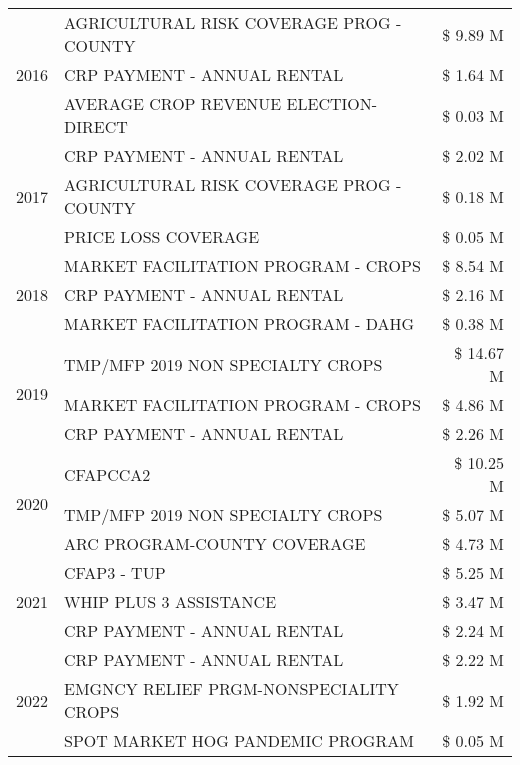 \begin{tabular}{llr}
\cline{1-3}
\multirow[t]{3}{*}{2016} & AGRICULTURAL RISK COVERAGE PROG - COUNTY & \$ 9.89 M \\
 & CRP PAYMENT - ANNUAL RENTAL & \$ 1.64 M \\
 & AVERAGE CROP REVENUE ELECTION-DIRECT & \$ 0.03 M \\
\cline{1-3}
\multirow[t]{3}{*}{2017} & CRP PAYMENT - ANNUAL RENTAL & \$ 2.02 M \\
 & AGRICULTURAL RISK COVERAGE PROG - COUNTY & \$ 0.18 M \\
 & PRICE LOSS COVERAGE & \$ 0.05 M \\
\cline{1-3}
\multirow[t]{3}{*}{2018} & MARKET FACILITATION PROGRAM - CROPS & \$ 8.54 M \\
 & CRP PAYMENT - ANNUAL RENTAL & \$ 2.16 M \\
 & MARKET FACILITATION PROGRAM - DAHG & \$ 0.38 M \\
\cline{1-3}
\multirow[t]{3}{*}{2019} & TMP/MFP 2019 NON SPECIALTY CROPS & \$ 14.67 M \\
 & MARKET FACILITATION PROGRAM - CROPS & \$ 4.86 M \\
 & CRP PAYMENT - ANNUAL RENTAL & \$ 2.26 M \\
\cline{1-3}
\multirow[t]{3}{*}{2020} & CFAPCCA2 & \$ 10.25 M \\
 & TMP/MFP 2019 NON SPECIALTY CROPS & \$ 5.07 M \\
 & ARC PROGRAM-COUNTY COVERAGE & \$ 4.73 M \\
\cline{1-3}
\multirow[t]{3}{*}{2021} & CFAP3 - TUP & \$ 5.25 M \\
 & WHIP PLUS 3 ASSISTANCE & \$ 3.47 M \\
 & CRP PAYMENT - ANNUAL RENTAL & \$ 2.24 M \\
\cline{1-3}
\multirow[t]{3}{*}{2022} & CRP PAYMENT - ANNUAL RENTAL & \$ 2.22 M \\
 & EMGNCY RELIEF PRGM-NONSPECIALITY CROPS & \$ 1.92 M \\
 & SPOT MARKET HOG PANDEMIC PROGRAM & \$ 0.05 M \\
\cline{1-3}
\bottomrule
\end{tabular}
